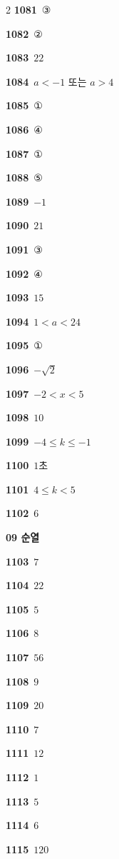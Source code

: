 \documentclass[10pt,a4paper]{article}
\begin{document}
\begin{multicols}{2}
\noindent\textbf{1081}\ ③\par
\noindent\textbf{1082}\ ②\par
\noindent\textbf{1083}\ $22$\par
\noindent\textbf{1084}\ $a<-1$ 또는 $a>4$\par
\noindent\textbf{1085}\ ①\par
\noindent\textbf{1086}\ ④\par
\noindent\textbf{1087}\ ①\par
\noindent\textbf{1088}\ ⑤\par
\noindent\textbf{1089}\ $-1$\par
\noindent\textbf{1090}\ $21$\par
\noindent\textbf{1091}\ ③\par
\noindent\textbf{1092}\ ④\par
\noindent\textbf{1093}\ $15$\par
\noindent\textbf{1094}\ $1<a<24$\par
\noindent\textbf{1095}\ ①\par
\noindent\textbf{1096}\ $-\sqrt{2}$\par
\noindent\textbf{1097}\ $-2<x<5$\par
\noindent\textbf{1098}\ $10$\par
\noindent\textbf{1099}\ $-4\le k\le -1$\par
\noindent\textbf{1100}\ $1$초\par
\noindent\textbf{1101}\ $4\le k<5$\par
\noindent\textbf{1102}\ $6$\par
\noindent\textbf{09 순열}\par\smallskip
\noindent\textbf{1103}\ $7$\par
\noindent\textbf{1104}\ $22$\par
\noindent\textbf{1105}\ $5$\par
\noindent\textbf{1106}\ $8$\par
\noindent\textbf{1107}\ $56$\par
\noindent\textbf{1108}\ $9$\par
\noindent\textbf{1109}\ $20$\par
\noindent\textbf{1110}\ $7$\par
\noindent\textbf{1111}\ $12$\par
\noindent\textbf{1112}\ $1$\par
\noindent\textbf{1113}\ $5$\par
\noindent\textbf{1114}\ $6$\par
\noindent\textbf{1115}\ $120$\par

\end{multicols}
\end{document}
